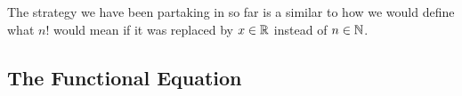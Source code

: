 The strategy we have been partaking in so far is a similar to how we would define what \( n!  \) would mean if it was replaced by \( x  \in \mathbb{R}  \) instead of \( n \in \mathbb{N}  \). 

\subsection{The Functional Equation}
